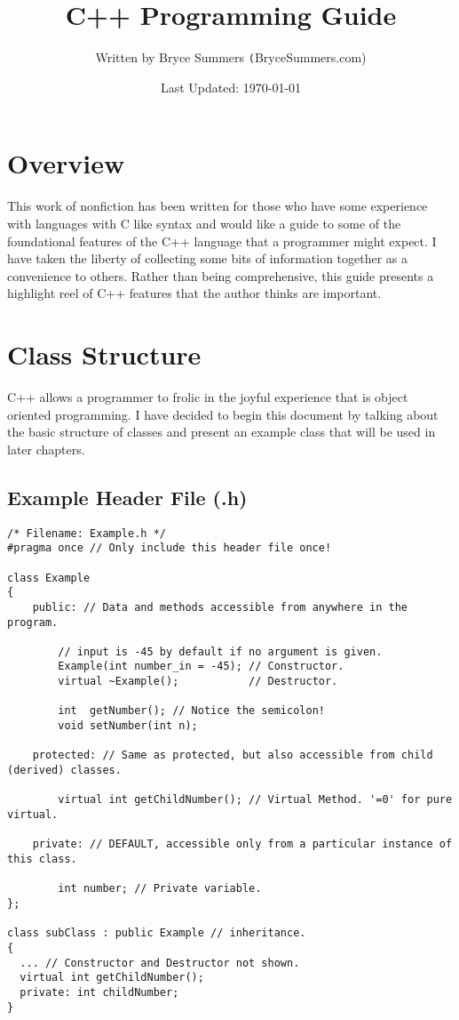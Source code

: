 \documentclass[12pt, letterpaper]{article}
\begin{document}
\title{\color{blue}C++ Programming Guide}
\author{Written by Bryce Summers \texttt(BryceSummers.com)}
\date{\color{red}Last Updated: \today}
\maketitle

\tableofcontents 

\newpage

\section{Overview}

This work of nonfiction has been written for those who have some experience with languages with C like syntax and would like a guide to some of the foundational features of the C++ language that a programmer might expect. I have taken the liberty of collecting some bits of information together as a convenience to others. Rather than being comprehensive, this guide presents a highlight reel of C++ features that the author thinks are important.

\section{Class Structure}

C++ allows a programmer to frolic in the joyful experience that is object oriented programming. I have decided to begin this document by talking about the basic structure of classes and present an example class that will be used in later chapters.

\subsection{Example Header File (.h)} \label{Example1}

\begin{verbatim}
/* Filename: Example.h */
#pragma once // Only include this header file once!

class Example
{
    public: // Data and methods accessible from anywhere in the program.

        // input is -45 by default if no argument is given.
       	Example(int number_in = -45); // Constructor.
        virtual ~Example();           // Destructor.

        int  getNumber(); // Notice the semicolon!
        void setNumber(int n);

    protected: // Same as protected, but also accessible from child (derived) classes.

        virtual int getChildNumber(); // Virtual Method. '=0' for pure virtual.

    private: // DEFAULT, accessible only from a particular instance of this class.

        int number; // Private variable.
};

class subClass : public Example // inheritance.
{
  ... // Constructor and Destructor not shown.
  virtual int getChildNumber();
  private: int childNumber;
}
\end{verbatim}
\end{document}
